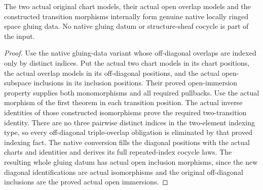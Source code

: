 \begin{theorem}
\label{hir:actual-two-model-native-glue-data}
\leanok
The two actual original chart models, their actual open overlap models
and the constructed transition morphisms internally form genuine native
locally ringed space gluing data. No native gluing datum or structure-sheaf
cocycle is part of the input.
\end{theorem}
\begin{proof}
Use the native gluing-data variant whose off-diagonal overlaps are indexed
only by distinct indices. Put the actual two chart models in its chart
positions, the actual overlap models in its off-diagonal positions, and
the actual open-subspace inclusions in its inclusion positions. Their
proved open-immersion property supplies both monomorphisms and all required
pullbacks. Use the actual morphism of the first theorem in each transition
position. The actual inverse identities of those constructed isomorphisms
prove the required two-transition identity. There are no three pairwise
distinct indices in the two-element indexing type, so every off-diagonal
triple-overlap obligation is eliminated by that proved indexing fact.
The native conversion fills the diagonal positions with the actual charts
and identities and derives its full repeated-index cocycle laws. The
resulting whole gluing datum has actual open inclusion morphisms, since
the new diagonal identifications are actual isomorphisms and the original
off-diagonal inclusions are the proved actual open immersions.
\end{proof}

